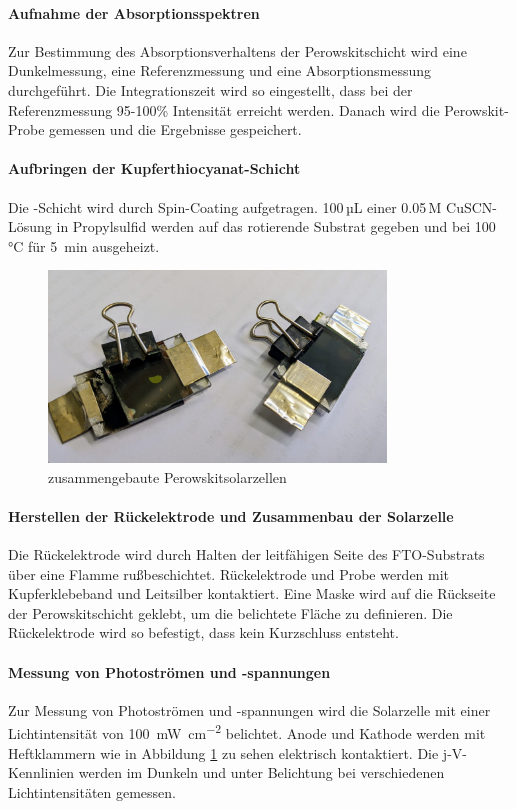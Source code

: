 \documentclass[12pt,a4paper,ngerman]{report}
\begin{document}
	\paragraph{Aufnahme der Absorptionsspektren}
		Zur Bestimmung des Absorptionsverhaltens der Perowskitschicht wird eine Dunkelmessung, eine Referenzmessung und eine Absorptionsmessung durchgeführt. Die Integrationszeit wird so eingestellt, dass bei der Referenzmessung 95-100\% Intensität erreicht werden. Danach wird die Perowskit-Probe gemessen und die Ergebnisse gespeichert.
	
	\paragraph{Aufbringen der Kupferthiocyanat-Schicht}	
		Die -Schicht wird durch Spin-Coating aufgetragen. 100\,µL einer 0.05\,M CuSCN-Lösung in Propylsulfid werden auf das rotierende Substrat gegeben und bei 100\,°C für \qty{5}{\minute} ausgeheizt.
	
		\begin{figure}
			\centering
			\includegraphics[width=0.8\textwidth]{Bilder/gebauteZelllen.jpg}
			\caption{zusammengebaute Perowskitsolarzellen}
			\label{img:gebauteZellen}
		\end{figure}
	\paragraph{Herstellen der Rückelektrode und Zusammenbau der Solarzelle}	
		Die Rückelektrode wird durch Halten der leitfähigen Seite des FTO-Substrats über eine Flamme rußbeschichtet. Rückelektrode und Probe werden mit Kupferklebeband und Leitsilber kontaktiert. Eine Maske wird auf die Rückseite der Perowskitschicht geklebt, um die belichtete Fläche zu definieren. Die Rückelektrode wird so befestigt, dass kein Kurzschluss entsteht.
		
	\paragraph{Messung von Photoströmen und -spannungen}	
		Zur Messung von Photoströmen und -spannungen wird die Solarzelle mit einer Lichtintensität von \qty{100}{\milli\watt\per\centi\metre\squared} belichtet. Anode und Kathode werden mit Heftklammern  wie in Abbildung \ref*{img:gebauteZellen} zu sehen elektrisch kontaktiert. Die j-V-Kennlinien werden im Dunkeln und unter Belichtung bei verschiedenen Lichtintensitäten gemessen.
\end{document}
